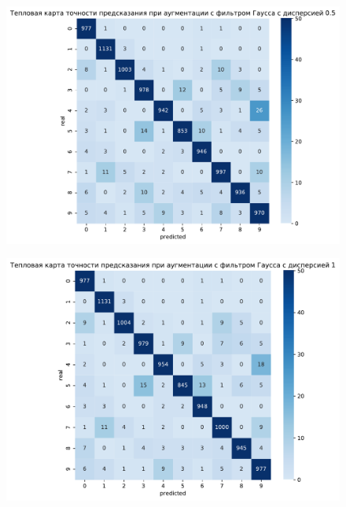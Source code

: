 \documentclass{article}
\begin{document}
\begin{figure}[H]
{		\label{app:erode}
	}
	\subfigure
	{
	    \begin{minipage}{8cm}
	        \centering
	        \includegraphics[scale=0.35]{TASK1 warm map filter0_5.pdf}
	    \end{minipage}
	    \label{app:filter0_5}
	}
	\subfigure
	{
		\begin{minipage}{8cm}
			\centering
			\includegraphics[scale=0.35]{TASK1 warm map filter1.pdf}
		\end{minipage}
		\label{app:filter1}
	}
\end{figure}
\end{document}
